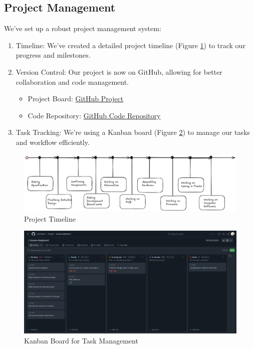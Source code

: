 \documentclass[a4paper,11pt]{article}%
\begin{document}
\subsection{Project Management}

We've set up a robust project management system:

\begin{enumerate}
    \item Timeline: We've created a detailed project timeline (Figure \ref{fig:timeline}) to track our progress and milestones.
    
    \item Version Control: Our project is now on GitHub, allowing for better collaboration and code management.
    \begin{itemize}
        \item Project Board: \href{https://github.com/users/parthishere/projects/2}{GitHub Project}
        \item Code Repository: \href{https://github.com/parthishere/Insane-Keyboard}{GitHub Code Repository}
    \end{itemize}
    
    \item Task Tracking: We're using a Kanban board (Figure \ref{fig:kanban}) to manage our tasks and workflow efficiently.
\end{enumerate}

\begin{figure}[H]
    \centering
    \includegraphics[scale=0.34]{figures/Timeline.png}
    \caption{Project Timeline}
    \label{fig:timeline}
\end{figure}

\begin{figure}[H]
    \centering
    \includegraphics[scale=0.26]{figures/kanban.png}
    \caption{Kanban Board for Task Management}
    \label{fig:kanban}
\end{figure}
\end{document}
